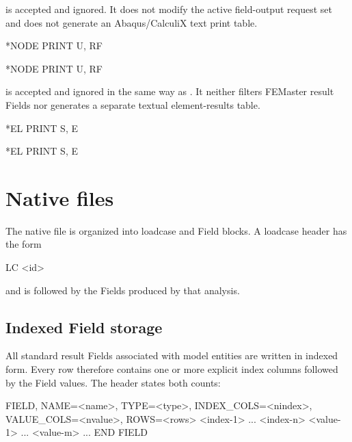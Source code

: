 
 is accepted and ignored. It does not modify the active field-output request set and does not generate an Abaqus/CalculiX text print table.

\exampleheading
\begin{dialectexamples}
\begin{femasterdeck}
*NODE PRINT
U, RF
\end{femasterdeck}
\begin{abaqusdeck}
*NODE PRINT
U, RF
\end{abaqusdeck}
\end{dialectexamples}


 is accepted and ignored in the same way as . It neither filters FEMaster result Fields nor generates a separate textual element-results table.

\exampleheading
\begin{dialectexamples}
\begin{femasterdeck}
*EL PRINT
S, E
\end{femasterdeck}
\begin{abaqusdeck}
*EL PRINT
S, E
\end{abaqusdeck}
\end{dialectexamples}

\section{Native  files}

The native  file is organized into loadcase and Field blocks. A loadcase header has the form
\begin{syntax}
LC <id>
\end{syntax}
and is followed by the Fields produced by that analysis.

\subsection*{Indexed Field storage}

All standard result Fields associated with model entities are written in indexed form. Every row therefore contains one or more explicit index columns followed by the Field values. The header states both counts:

\begin{syntax}
FIELD, NAME=<name>, TYPE=<type>,
INDEX_COLS=<nindex>, VALUE_COLS=<nvalue>, ROWS=<rows>
<index-1> ... <index-n> <value-1> ... <value-m>
...
END FIELD
\end{syntax}

